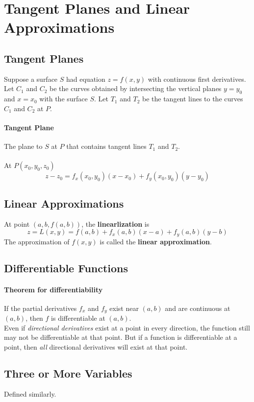 \documentclass{report}  %
\begin{document}
\newpage

\section{Tangent Planes and Linear Approximations}
\subsection*{Tangent Planes}
Suppose a surface $S$ had equation $z=f(x,y)$ with continuous first derivatives.
Let $C_1$ and $C_2$ be the curves obtained by intersecting the vertical planes $y=y_0$ and $x=x_0$ with the surface $S$. 
Let $T_1$ and $T_2$ be the tangent lines to the curves $C_1$ and $C_2$ at $P$. 

\paragraph{Tangent Plane} The plane to $S$ at $P$ that contains tangent lines $T_1$ and $T_2$. \\ \\
At $P(x_0,y_0,z_0)$
\begin{equation}
	z - z_0 = f_x(x_0,y_0)(x-x_0) + f_y(x_0,y_0)(y-y_0)
\end{equation}

\subsection*{Linear Approximations}
At point $(a, b, f(a, b))$, the \textbf{linearlization} is
\begin{equation}
	z = L(x, y) = f(a, b) + f_x(a,b)(x-a) + f_y(a,b)(y-b)
\end{equation}
The approximation of $f(x, y)$ is called the \textbf{linear approximation}.

\subsection*{Differentiable Functions}
\paragraph{Theorem for differentiability} If the partial derivatives $f_x$ and $f_y$ exist near $(a, b)$ and are continuous at $(a, b)$, then $f$ is differentiable at $(a, b)$. \\ 

Even if \textit{directional derivatives} exist at a point in every direction, the function still may not be differentiable at that point. 
But if a function is differentiable at a point, then \textit{all} directional derivatives will exist at that point. 

\subsection*{Three or More Variables}
Defined similarly.
\end{document}
